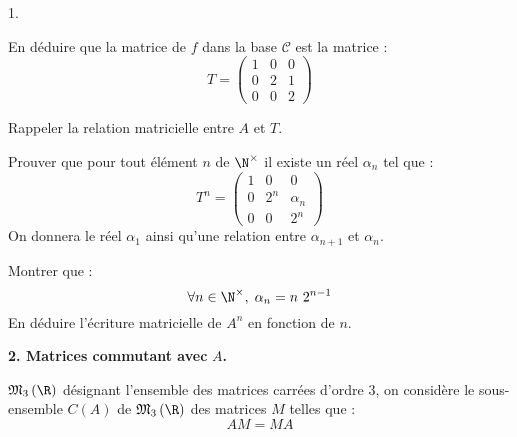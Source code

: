 \documentclass[11pt]{article}%
\begin{document}
\begin{noliste}{1.}
\item En déduire que la matrice de $f$ dans la base $\mathcal{C}$ est
la
matrice : 
\[
T = \left( 
\begin{array}{lll}
1 & 0 & 0 \\
0 & 2 & 1 \\
0 & 0 & 2
\end{array}
\right)
\]

\item Rappeler la relation matricielle entre $A$ et $T$.

\item Prouver que pour tout élément $n$ de $\N^{\times }$ il existe
un réel $\alpha_{n}$ tel que : 
\[
T^{n} = \left( 
\begin{array}{lll}
1 & 0 & 0 \\
0 & 2^{n} & \alpha_{n} \\
0 & 0 & 2^{n}
\end{array}
\right)
\]
On donnera le réel $\alpha_{1}$ ainsi qu'une relation entre $\alpha_{n
+ 1}$
et $\alpha_{n}$.

\item Montrer que : 
\[
\forall n\in \N^{\times },\;\alpha_{n} = n\ 2^{n-1}
\]
En déduire l'écriture matricielle de $A^{n}$ en fonction de $n$.
\end{noliste}

\noindent \textbf{2. Matrices commutant avec }$A$\textbf{.}

\noindent $\mathfrak{M}_{3}\left( \R\right) $ désignant l'ensemble
des matrices carrées d'ordre 3, on considère le sous-ensemble $C\left(
A\right) $ de $\mathfrak{M}_{3}\left( \R\right) $ des matrices $M$
telles que : 
\[
AM = MA
\]
\end{document}
